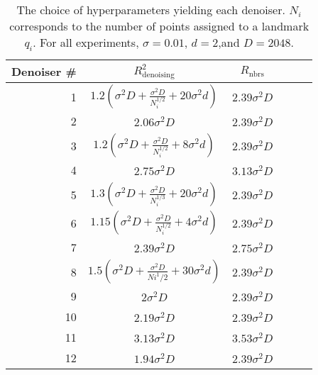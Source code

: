 \begin{table}[t]
\caption{The choice of hyperparameters yielding each denoiser. $N_{i}$ corresponds to the number of points assigned to a landmark $q_i$. For all experiments, $\sigma=0.01$, $d=2$,and $D=2048$.}
\label{parameter_choices_table}
\vskip 0.15in
\begin{center}
\begin{small}
\begin{sc}
\begin{tabular}{rccccc}
\toprule
Denoiser \# & $R_{\text{denoising}}^2$ & $R_{\text{nbrs}}$ \\
\midrule
1 & $1.2(\sigma^2D + \frac{\sigma^2 D}{N_i^{1/2}}+20\sigma^2d)$ & $2.39\sigma^2D$ \\
2 & $2.06\sigma^2D$ & $2.39\sigma^2D$ \\
3 & $1.2(\sigma^2D + \frac{\sigma^2 D}{N_i^{1/2}}+8\sigma^2d)$ & $2.39\sigma^2D$ \\
4 & $2.75 \sigma^2 D$ & $3.13\sigma^2D$ \\
5 & $1.3(\sigma^2D + \frac{\sigma^2 D}{N_i^{1/3}}+20\sigma^2d)$& $2.39\sigma^2D$ \\
6 & $1.15(\sigma^2D + \frac{\sigma^2 D}{N_i^{1/2}}+4\sigma^2d)$  & $2.39\sigma^2D$ \\
7 & $2.39\sigma^2D$ & $2.75\sigma^2D$ \\
8 &  $1.5 ( \sigma^2 D + \frac{\sigma^2 D}{Ni^1/2} +30 \sigma^2 d)$ & $2.39\sigma^2D$ \\
9 & $2\sigma^2D$ & $2.39\sigma^2D$ \\
10 & $2.19\sigma^2D$ & $2.39\sigma^2D$ \\
11 & $3.13\sigma^2D$ & $3.53\sigma^2D$ \\
12 & $1.94\sigma^2D$ & $2.39\sigma^2D$ \\
\bottomrule
\end{tabular}
\end{sc}
\end{small}
\end{center}
\vskip -0.1in
\end{table}









